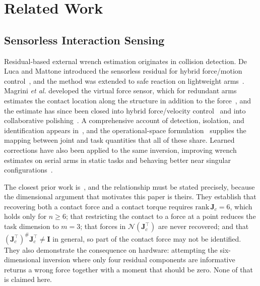 \documentclass{ieeeaccess}
\begin{document}
\section{Related Work}
\label{sec:related}

\subsection{Sensorless Interaction Sensing}
Residual-based external wrench estimation originates in collision detection. De
Luca and Mattone introduced the sensorless residual for hybrid force/motion
control~\cite{deluca2005sensorless}, and the method was extended to safe reaction
on lightweight arms~\cite{deluca2006collision}. Magrini \emph{et al.} developed
the virtual force sensor, which for redundant arms estimates the contact location
along the structure in addition to the force~\cite{magrini2014virtual}, and the
estimate has since been closed into hybrid force/velocity
control~\cite{magrini2016hybrid} and into collaborative
polishing~\cite{gaz2018polishing}. A comprehensive account of detection,
isolation, and identification appears in~\cite{haddadin2017survey}, and the
operational-space formulation~\cite{khatib1987operational} supplies the mapping
between joint and task quantities that all of these share. Learned corrections have
also been applied to the same inversion, improving wrench estimates on serial arms
in static tasks and behaving better near singular
configurations~\cite{osburg2022dnnwrench}.

The closest prior work is~\cite{magrini2014virtual}, and the relationship must be
stated precisely, because the dimensional argument that motivates this paper is
theirs. They establish that recovering both a contact force and a contact torque
requires $\mathrm{rank}\,\bm J_c=6$, which holds only for $n\ge6$; that
restricting the contact to a force at a point reduces the task dimension to
$m=3$; that forces in $\mathcal{N}(\bm J_c^{\!\top})$ are never recovered; and
that $(\bm J_c^{\!\top})^{\#}\bm J_c^{\!\top}\neq\bm I$ in general, so part of the
contact force may not be identified. They also demonstrate the consequence on
hardware: attempting the six-dimensional inversion where only four residual
components are informative returns a wrong force together with a moment that
should be zero. None of that is claimed here.
\end{document}
